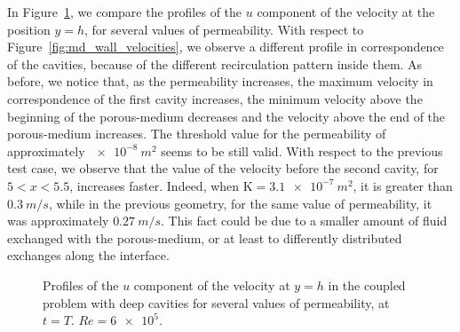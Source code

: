 In Figure~\ref{fig:md_wall_velocities_deep}, we compare the profiles of the $u$ component of the velocity at the position $y=h$, for several values of permeability. With respect to Figure~\ref{fig:md_wall_velocities}, we observe a different profile in correspondence of the cavities, because of the different recirculation pattern inside them. As before, we notice that, as the permeability increases, the maximum velocity in correspondence of the first cavity increases, the minimum velocity above the beginning of the porous-medium decreases and the velocity above the end of the porous-medium increases. The threshold value for the permeability of approximately $\SI{e-8}{m^2}$ seems to be still valid. With respect to the previous test case, we observe that the value of the velocity before the second cavity, for $5 < x < 5.5$, increases faster. Indeed, when $\mathrm{K} = \SI{3.1e-7}{m^2}$, it is greater than $\SI{0.3}{m/s}$, while in the previous geometry, for the same value of permeability, it was approximately $\SI{0.27}{m/s}$. This fact could be due to a smaller amount of fluid exchanged with the porous-medium, or at least to differently distributed exchanges along the interface.
\begin{figure}
	\centering
	
	\caption[Profiles of the $u$ component of the velocity at $y=h$ in the coupled problem with deep cavities]{Profiles of the $u$ component of the velocity at $y=h$ in the coupled problem with deep cavities for several values of permeability, at $t=T$. $Re = \num{6e5}$.}
	\label{fig:md_wall_velocities_deep}
\end{figure}

